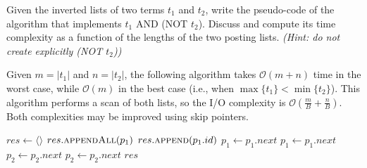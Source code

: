 \exercise

Given the inverted lists of two terms $t_1$ and $t_2$, write the pseudo-code of the
algorithm that implements $t_1$ AND (NOT $t_2$). Discuss and compute its time
complexity as a function of the lengths of the two posting lists.  \emph{(Hint:
do not create explicitly (NOT $t_2$))}

\solution

Given $m = |t_1|$ and $n = |t_2|$, the following algorithm takes
$\mathcal{O}(m+n)$ time in the worst case, while $\mathcal{O}(m)$ in the best
case (i.e., when $\max\{t_1\} < \min\{t_2\}$). This algorithm performs a scan of
both lists, so the I/O complexity is $\mathcal{O}(\frac{m}{B}+\frac{n}{B})$.
Both complexities may be improved using skip pointers.

\begin{algorithm}[H]
\caption{}\label{alg:andnot}
\begin{algorithmic}[1]
\State $res \gets \langle\rangle$
\State $res.\text{\scshape appendAll}(p_1)$
\State $res.\text{\scshape append}(p_1.id)$
\State $p_1 \gets p_1.next$
\State $p_1 \gets p_1.next$
\State $p_2 \gets p_2.next$
\Else
\State $p_2 \gets p_2.next$
\EndIf
\EndWhile
\State \Return $res$
\EndFunction
\end{algorithmic}
\end{algorithm}
